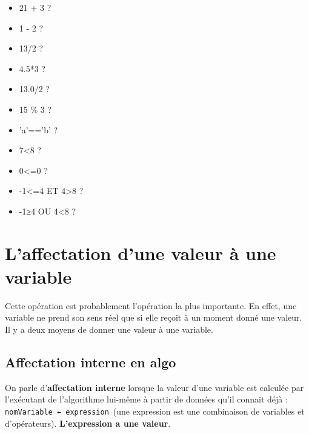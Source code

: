 \documentclass[11pt,a4paper]{article}
\begin{document}
					\begin{itemize}
				
			\item 21 + 3 ?  \textcolor{gray}{\underline{\hspace*{2em}}} 
			\item 1 - 2 ?  \textcolor{gray}{\underline{\hspace*{2em}}} 
			\item 13/2 ?  \textcolor{gray}{\underline{\hspace*{1em}}} 
			\item 4.5*3 ?  \textcolor{gray}{\underline{\hspace*{3em}}} 
			\item 13.0/2 ?  \textcolor{gray}{\underline{\hspace*{2em}}} 
			\item 15 \% 3 ?  \textcolor{gray}{\underline{\hspace*{1em}}} 
			\item 'a'=='b' ?  \textcolor{gray}{\underline{\hspace*{3em}}} 
			\item 7<8 ?  \textcolor{gray}{\underline{\hspace*{3em}}} 
			\item 0<=0 ?  \textcolor{gray}{\underline{\hspace*{3em}}} 
			\item -1<=4 ET 4>8 ?  \textcolor{gray}{\underline{\hspace*{3em}}} 
			\item -1≥4 OU 4<8 ?  \textcolor{gray}{\underline{\hspace*{3em}}} 
					\end{itemize}
				\section{L'affectation d'une valeur \`a une variable}
				Cette op\'eration est probablement l'op\'eration la plus importante. En effet, une variable ne
        prend son sens r\'eel que si elle re\c coit \`a un moment donn\'e une valeur. Il y a deux moyens de
        donner une valeur \`a une variable.
      
            \par
        \subsection{Affectation interne en algo}
          On parle d'\textbf{affectation interne} lorsque la valeur d'une variable est \guillemotleft  calcul\'ee \guillemotright  par l'ex\'ecutant
          de l'algorithme lui-m\^eme \`a partir de donn\'ees qu'il connait d\'ej\`a :
          \,\verb|nomVariable ← expression|\,
          (une expression est une combinaison de variables et d'op\'erateurs). \textbf{L'expression a une valeur}.
        
\end{document}
